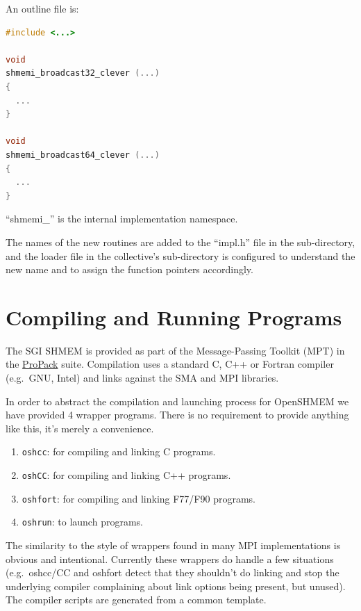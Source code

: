 \documentclass[english]{article}
\newcommand{\openshmem} {\mbox{OpenSHMEM}\xspace}
\begin{document}
\noindent
An outline file is:

\vspace{0.1in}
\begin{minipage}{0.75\linewidth}
\begin{lstlisting}[language=C,caption={Outline of broadcast implementation}]
#include <...>

void
shmemi_broadcast32_clever (...)
{
  ...
}

void
shmemi_broadcast64_clever (...)
{
  ...
}
\end{lstlisting}
\end{minipage}
\vspace{0.1in}

``shmemi\_'' is the internal implementation namespace.

The names of the new routines are added to the ``impl.h'' file in the
sub-directory, and the loader file in the collective's sub-directory
is configured to understand the new name and to assign the function
pointers accordingly.

\section{Compiling and Running Programs}

The SGI SHMEM is provided as part of the Message-Passing Toolkit (MPT)
in the
\href{http://www.sgi.com/products/software/propack.html}{ProPack}
suite. Compilation uses a standard C, C++ or Fortran compiler
(e.g.\ GNU, Intel) and links against the SMA and MPI libraries.

In order to abstract the compilation and launching process for
\openshmem we have provided 4 wrapper programs.  There is no
requirement to provide anything like this, it's merely a convenience.

\begin{enumerate}
\item \texttt{oshcc}: for compiling and linking C programs.
\item \texttt{oshCC}: for compiling and linking C++ programs.
\item \texttt{oshfort}: for compiling and linking F77/F90 programs.
\item \texttt{oshrun}: to launch programs.
\end{enumerate}

The similarity to the style of wrappers found in many MPI
implementations is obvious and intentional. Currently these wrappers
do handle a few situations (e.g.\ oshcc/CC and oshfort detect that they
shouldn't do linking and stop the underlying compiler complaining
about link options being present, but unused). The compiler scripts
are generated from a common template.
\end{document}
